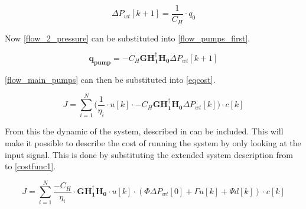 \begin{equation}
\Delta P_{wt}[k+1] = \frac{1}{C_H} \cdot q_0 \label{flow_2_pressure}
\end{equation}

Now \eqref{flow_2_pressure} can be substituted into \eqref{flow_pumps_first}.  

\begin{equation}
\pmb{q_{pump}} = -C_H \pmb{G H_1^{\dagger} H_0} \Delta P_{wt}[k+1] \label{flow_main_pumps}
\end{equation}

\eqref{flow_main_pumps} can then be substituted into \eqref{eqcost}. 

\begin{equation}
J = \sum_{i=1}^{N} \Big(\frac{1}{\eta_i}\cdot u[k]\cdot -C_H \pmb{G H_1^{\dagger} H_0} \Delta P_{wt}[k]\Big)\cdot c[k] \label{costfunc1}
\end{equation}

From this the dynamic of the system, described in  can be included. This will make it possible to describe the cost of running the system by only looking at the input signal. This is done by substituting the extended system description from  to \eqref{costfunc1}. 

\begin{equation}
 	J = \sum_{i=1}^{N} \frac{-C_H}{\eta_i}\cdot\pmb{G H_1^{\dagger} H_0} \cdot u[k]\cdot (\Phi\Delta P_{wt}[0] +\Gamma u[k]+ \Psi d[k])\cdot c[k]
 \end{equation} 

 